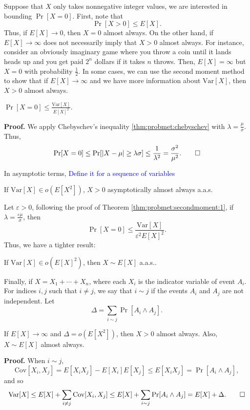 Suppose that $X$ only takes nonnegative integer values, we are interested in bounding $\Pr[X = 0]$. First, note that 
\begin{equation}\label{eq:probmet:secondmoment:1}
    \Pr[X > 0] \leq E[X].   
\end{equation}
Thus, if $E[X] \to 0$, then $X = 0$ almost always. On the other hand, if $E[X] \to \infty$ does not necessarily imply that $X > 0$ almost always. For instance, consider an obviously imaginary game where you throw a coin until it lands heads up and you get paid $2^n$ dollars if it takes $n$ throws. Then, $E[X] = \infty$ but $X = 0$ with probability $\frac{1}{2}$. In some cases, we can use the second moment method to show that if $E[X] \to \infty$ and we have more information about $\text{Var}[X]$, then $X > 0$ almost always. \par

\begin{theorem}\label{thm:probmet:secondmoment:1}
    \(\Pr[X = 0] \leq \frac{\text{Var}[X]}{E[X]^2}.\)\cite{alon2016probabilistic}
\end{theorem}

\textbf{Proof. } We apply Chebyschev's inequality \ref{thm:probmet:chebyschev} with $\lambda = \frac{\mu}{\sigma}$. Thus, 
\[\Pr[X = 0] \leq \Pr[|X - \mu| \geq \lambda \sigma] \leq \frac{1}{\lambda^2} = \frac{\sigma^2}{\mu^2}. \qed \]

In asymptotic terms, 
\textcolor{blue}{Define it for a sequence of variables}

\begin{corollary}\label{cor:probmet:secondmoment:1}
    If $\text{Var}[X] \in o(E[X^2])$, $X > 0$ asymptotically almost always a.a.s. \cite{alon2016probabilistic}
\end{corollary}

Let $\varepsilon > 0$, following the proof of Theorem \ref{thm:probmet:secondmoment:1}, if $\lambda = \frac{\varepsilon\mu}{\sigma}$, then
\[\Pr[X = 0] \leq \frac{\text{Var}[X]}{\varepsilon^2E[X]^2}.\]
Thus, we have a tighter result:
\begin{corollary}\label{cor:probmet:secondmoment:2}
    If $\text{Var}[X] \in o(E[X]^2)$, then $X \sim E[X]$ a.a.s.. \cite{alon2016probabilistic}
\end{corollary}

Finally, if $X = X_1 + \cdots + X_n$, where each $X_i$ is the indicator variable of event $A_i$. For indices $i, j$ such that $i \neq j$, we say that $i \sim j$ if the events $A_i$ and $A_j$ are not independent. Let
\[\Delta  = \sum_{i \sim j} \Pr[A_i \wedge A_j].\]
\begin{corollary}\label{cor:probmet:secondmoment:3}
    If $E[X] \to \infty$ and $\Delta = o(E[X^2])$, then $X > 0$ almost always. Also, $X \sim E[X]$ almost always. \cite{alon2016probabilistic}
\end{corollary}
\textbf{Proof. } When $i \sim j$, 
\[\text{Cov}[X_i, X_j] = E[X_iX_j] - E[X_i]E[X_j] \leq E[X_iX_j] = \Pr[A_i \wedge A_j],\]
and so 
\[\text{Var}[X] \leq E[X] + \sum_{i \neq j}\text{Cov}[X_i, X_j] \leq E[X] + \sum_{i \sim j}\Pr[A_i \wedge A_j] = E[X] + \Delta. \qed\]

